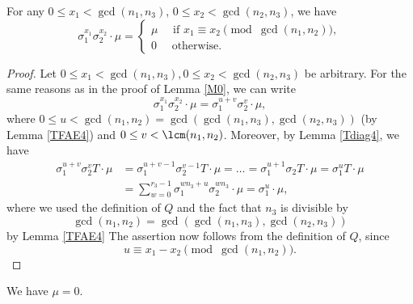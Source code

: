 \begin{lemma}\label{M04}
For any $0\leq x_1<\gcd(n_1,n_3)$, $ 0\leq x_2<\gcd(n_2,n_3)$, we have $$\sigma_1^{x_1}\sigma_2^{x_2}\cdot \mu=\begin{cases}
\mu \quad \text{ if } x_1\equiv x_2 \pmod{\gcd(n_1,n_2)},\\
0 \quad \text{ otherwise}.
\end{cases}$$
\end{lemma}
\begin{proof}
Let $0\leq x_1<\gcd(n_1,n_3), 0\leq x_2<\gcd(n_2,n_3)$ be arbitrary. For the same reasons as in the proof of Lemma \ref{M0}, we can write $$\sigma_1^{x_1}\sigma_2^{x_2}\cdot \mu=\sigma_1^{u+v}\sigma_2^{v} \cdot \mu,$$
where $0\leq u<\gcd(n_1,n_2)=\gcd(\gcd(n_1,n_3),\gcd(n_2,n_3))$ (by Lemma \ref{TFAE4}) and $0\leq v<\lcm(n_1,n_2)$. Moreover, by Lemma \ref{Tdiag4}, we have
\begin{align*}
\sigma_1^{u+v}\sigma_2^{v}T\cdot \mu&=\sigma_1^{u+v-1}\sigma_2^{v-1}T\cdot \mu=\dots=\sigma_1^{u+1}\sigma_2T\cdot \mu=\sigma_1^{u}T\cdot \mu\\
&=\sum_{w=0}^{r_3-1}\sigma_1^{wn_3+u}\sigma_2^{wn_3}\cdot \mu=\sigma_1^u\cdot \mu,
\end{align*}
where we used the definition of $Q$ and the fact that $n_3$ is divisible by $$\gcd(n_1,n_2)=\gcd(\gcd(n_1,n_3),\gcd(n_2,n_3))$$ by Lemma \ref{TFAE4}
The assertion now follows from the definition of $Q$, since $$u\equiv x_1-x_2 \pmod{\gcd(n_1,n_2)}.$$
\end{proof}
\pagebreak
\begin{prop}
We have $\mu=0.$
\end{prop}
